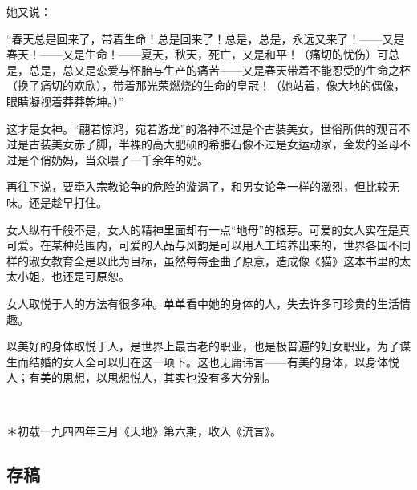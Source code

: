 \par 她又说：
\par “春天总是回来了，带着生命！总是回来了！总是，总是，永远又来了！——又是春天！——又是生命！——夏天，秋天，死亡，又是和平！（痛切的忧伤）可总是，总是，总又是恋爱与怀胎与生产的痛苦——又是春天带着不能忍受的生命之杯（换了痛切的欢欣），带着那光荣燃烧的生命的皇冠！（她站着，像大地的偶像，眼睛凝视着莽莽乾坤。）”
\par 这才是女神。“翩若惊鸿，宛若游龙”的洛神不过是个古装美女，世俗所供的观音不过是古装美女赤了脚，半裸的高大肥硕的希腊石像不过是女运动家，金发的圣母不过是个俏奶妈，当众喂了一千余年的奶。
\par 再往下说，要牵入宗教论争的危险的漩涡了，和男女论争一样的激烈，但比较无味。还是趁早打住。
\par 女人纵有千般不是，女人的精神里面却有一点“地母”的根芽。可爱的女人实在是真可爱。在某种范围内，可爱的人品与风韵是可以用人工培养出来的，世界各国不同样的淑女教育全是以此为目标，虽然每每歪曲了原意，造成像《猫》这本书里的太太小姐，也还是可原恕。
\par 女人取悦于人的方法有很多种。单单看中她的身体的人，失去许多可珍贵的生活情趣。
\par 以美好的身体取悦于人，是世界上最古老的职业，也是极普遍的妇女职业，为了谋生而结婚的女人全可以归在这一项下。这也无庸讳言——有美的身体，以身体悦人；有美的思想，以思想悦人，其实也没有多大分别。
\par  
\par ＊初载一九四四年三月《天地》第六期，收入《流言》。

\subsection{存稿}

